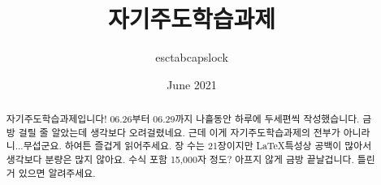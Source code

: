 \documentclass[chapter, oneside]{oblivoir}
\title{자기주도학습과제}
\author{esctabcapslock}
\date{June 2021}
\begin{document}
\maketitle


\begin{abstract}
    자기주도학습과제입니다! 06.26부터 06.29까지 나흘동안 하루에 두세편씩 작성했습니다. 금방 걸릴 줄 알았는데 생각보다 오려걸렸네요. 근데 이게 자기주도학습과제의 전부가 아니라니...무섭군요. 하여튼 즐겁게 읽어주세요. 장 수는 21장이지만 \LaTeX 특성상 공백이 많아서 생각보다 분량은 많지 않아요. 수식 포함 15,000자 정도? 아프지 않게 금방 끝날겁니다. 틀린거 있으면 알려주세요.
\end{abstract}












\end{document}
